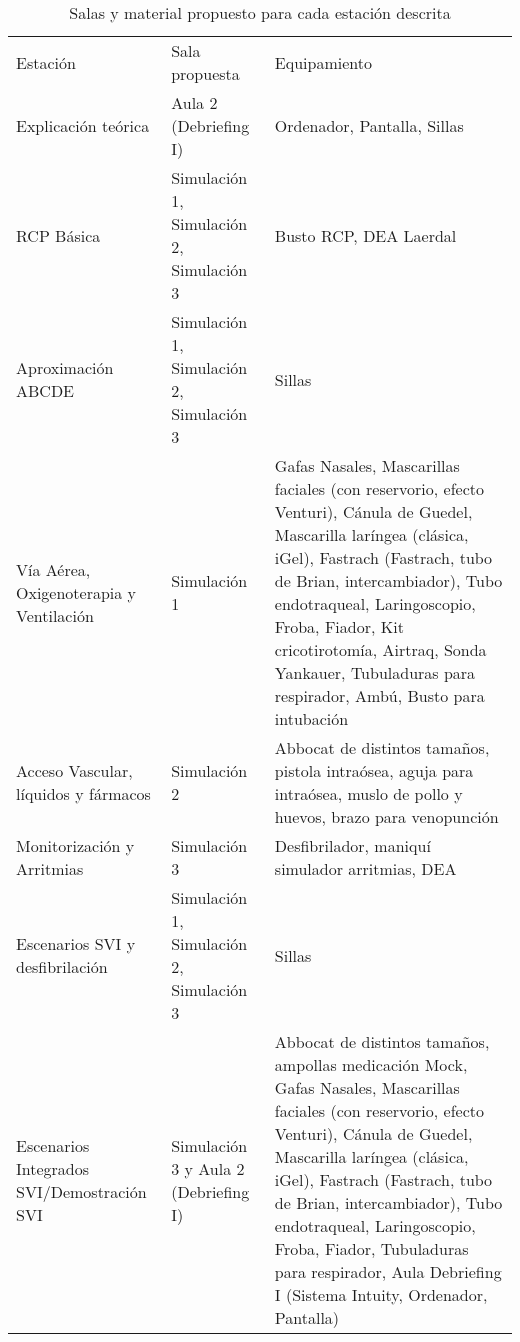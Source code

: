 \begin{table}[hptb]
    \centering
    \begin{tabular}{N{0.25\textwidth}N{0.2\textwidth}M{0.45\textwidth}}
        {\color[HTML]{FFFFFF} Estación} & {\color[HTML]{FFFFFF} Sala propuesta} & {\color[HTML]{FFFFFF} Equipamiento} \\
        Explicación teórica & Aula 2 (Debriefing I) & Ordenador, Pantalla, Sillas \\
        RCP Básica & Simulación 1, Simulación 2, Simulación 3 & Busto RCP, DEA Laerdal \\
        Aproximación ABCDE & Simulación 1, Simulación 2, Simulación 3 & Sillas \\
        Vía Aérea, Oxigenoterapia y Ventilación & Simulación 1 & Gafas Nasales, Mascarillas faciales (con reservorio, efecto Venturi), Cánula de Guedel, Mascarilla laríngea (clásica, iGel), Fastrach (Fastrach, tubo de Brian, intercambiador), Tubo endotraqueal, Laringoscopio, Froba, Fiador, Kit cricotirotomía, Airtraq, Sonda Yankauer, Tubuladuras para respirador, Ambú, Busto para intubación \\
        Acceso Vascular, líquidos y fármacos & Simulación 2 & Abbocat de distintos tamaños, pistola intraósea, aguja para intraósea, muslo de pollo y huevos, brazo para venopunción \\
        Monitorización y Arritmias & Simulación 3 & Desfibrilador, maniquí simulador arritmias, DEA \\
        Escenarios SVI y desfibrilación & Simulación 1, Simulación 2, Simulación 3 & Sillas \\
        Escenarios Integrados SVI/Demostración SVI & Simulación 3 y Aula 2 (Debriefing I) & Abbocat de distintos tamaños, ampollas medicación Mock, Gafas Nasales, Mascarillas faciales (con reservorio, efecto Venturi), Cánula de Guedel, Mascarilla laríngea (clásica, iGel), Fastrach (Fastrach, tubo de Brian, intercambiador), Tubo endotraqueal, Laringoscopio, Froba, Fiador, Tubuladuras para respirador, Aula Debriefing I (Sistema Intuity, Ordenador, Pantalla) \\ \hline
    \end{tabular}
    \caption{Salas y material propuesto para cada estación descrita}
    \label{tab:Brusilov:SVI:SalasEstaciones}
\end{table}

